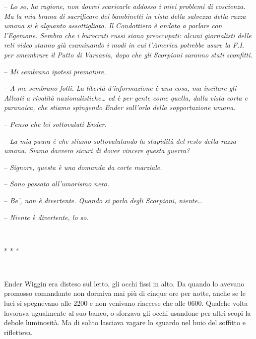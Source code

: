 {-- \emph{Lo so, ha ragione, non dovrei scaricarle addosso i miei
		problemi di coscienza. Ma la mia brama di sacrificare dei bambinetti in
		vista della salvezza della razza umana si è alquanto assottigliata. Il
		Condottiero è andato a parlare con l'Egemone. Sembra che i burocrati
		russi siano preoccupati: alcuni giornalisti delle reti video stanno già
		esaminando i modi in cui l'America potrebbe usare la F.I. per smembrare
		il Patto di Varsavia, dopo che gli Scorpioni saranno stati sconfitti.}}

{-- \emph{Mi sembrano ipotesi premature.}}

{-- \emph{A me sembrano folli. La libertà d'informazione è una cosa, ma
		incitare gli Alleati a rivalità nazionalistiche\ldots{} ed è per gente
		come quella, dalla vista corta e paranoica, che stiamo spingendo Ender
		sull'orlo della sopportazione umana.}}

{-- \emph{Penso che lei sottovaluti Ender.}}

{-- \emph{La mia paura è che stiamo sottovalutando la stupidità del
		resto della razza umana. Siamo davvero sicuri di dover vincere questa
		guerra?}}

{-- \emph{Signore, questa è una domanda da corte marziale.}}

{-- \emph{Sono passato all'umorismo nero.}}

{-- \emph{Be', non è divertente. Quando si parla degli Scorpioni,
		niente\ldots{}}}

{-- \emph{Niente è divertente, lo so.}}

{~}

\begin{center}
	{* * *}
\end{center}

{~}

{Ender Wiggin era disteso sul letto, gli occhi fissi in alto. Da quando
	lo avevano promosso comandante non dormiva mai più di cinque ore per
	notte, anche se le luci si spegnevano alle 2200 e non venivano riaccese
	che alle 0600. Qualche volta lavorava ugualmente al suo banco, o
	sforzava gli occhi usandone per altri scopi la debole luminosità. Ma di
	solito lasciava vagare lo sguardo nel buio del soffitto e rifletteva.}

